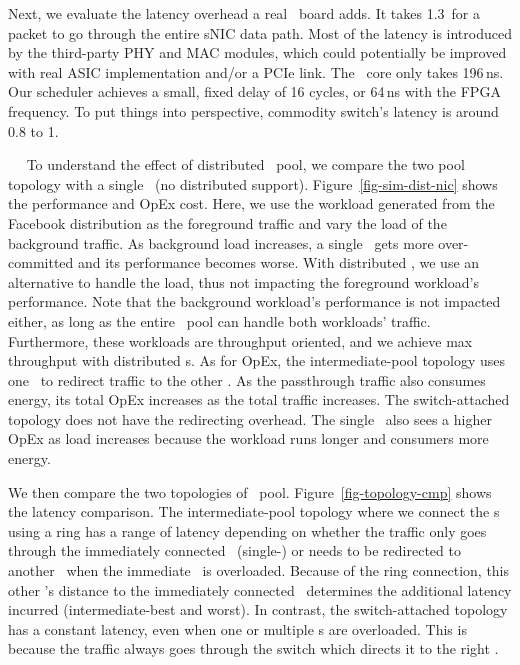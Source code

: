 Next, we evaluate the latency overhead a real \snic\ board adds.  
It takes 1.3\mus\ for a packet to go through the entire sNIC data path. %
Most of the latency is introduced by the third-party PHY and MAC modules, which could potentially be improved with real ASIC implementation and/or a PCIe link. 
The \snic\ core only takes 196\,ns.
Our scheduler achieves a small, fixed delay of 16 cycles, or 64\,ns with the FPGA frequency. 
To put things into perspective, commodity switch's latency is around 0.8 to 1\mus.  

~~
To understand the effect of distributed \snic\ pool, we compare the two pool topology with a single \snic\ (no distributed support).
Figure~\ref{fig-sim-dist-nic} shows the performance and OpEx cost.
Here, we use the workload generated from the Facebook distribution as the foreground traffic and vary the load of the background traffic.
As background load increases, a single \snic\ gets more over-committed and its performance becomes worse.
With distributed \snic, we use an alternative \snic{} to handle the load, thus not impacting the foreground workload's performance. Note that the background workload's performance is not impacted either, as long as the entire \snic\ pool can handle both workloads' traffic. Furthermore, these workloads are throughput oriented, and we achieve max throughput with distributed \snic{}s.
As for OpEx, the intermediate-pool topology uses one \snic\ to redirect traffic to the other \snic.
As the passthrough traffic also consumes energy, its total OpEx increases as the total traffic increases.
The switch-attached topology does not have the redirecting overhead.
The single \snic\ also sees a higher OpEx as load increases because the workload runs longer and consumers more energy.

We then compare the two topologies of \snic\ pool. %
Figure~\ref{fig-topology-cmp} shows the latency comparison.
The intermediate-pool topology where we connect the \snic{}s using a ring has a range of latency depending on whether the traffic only goes through the immediately connected \snic\ (single-\snic) or needs to be redirected to another \snic\ when the immediate \snic\ is overloaded. 
Because of the ring connection, this other \snic's distance to the immediately connected \snic\ determines the additional latency incurred (intermediate-best and worst).
In contrast, the switch-attached topology has a constant latency, even when one or multiple \snic{}s are overloaded. This is because the traffic always goes through the switch which directs it to the right \snic.

